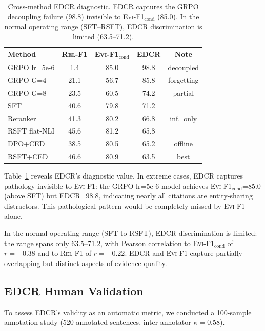 \documentclass[11pt,a4paper]{article}
\newcommand{\evi}{\textsc{Evi-F1}}
\newcommand{\edcr}{\textsc{EDCR}}
\newcommand{\relf}{\textsc{Rel-F1}}
\begin{document}
\begin{table}[t]
\centering
\small
\begin{tabular}{lcccc}
\toprule
\textbf{Method} & \textbf{\relf{}} & \textbf{\evi{}$_\text{cond}$} & \textbf{\edcr{}} & \textbf{Note} \\
\midrule
GRPO lr=5e-6 & 1.4 & 85.0 & 98.8 & decoupled \\
GRPO G=4 & 21.1 & 56.7 & 85.8 & forgetting \\
GRPO G=8 & 23.5 & 60.5 & 74.2 & partial \\
SFT & 40.6 & 79.8 & 71.2 & \\
Reranker & 41.3 & 80.2 & 66.8 & inf.\ only \\
RSFT flat-NLI & 45.6 & 81.2 & 65.8 & \\
DPO+CED & 38.5 & 80.5 & 65.2 & offline \\
RSFT+CED & 46.6 & 80.9 & 63.5 & best \\
\bottomrule
\end{tabular}
\caption{Cross-method \edcr{} diagnostic. \edcr{} captures the GRPO decoupling failure (98.8) invisible to \evi{}$_\text{cond}$ (85.0). In the normal operating range (SFT--RSFT), \edcr{} discrimination is limited (63.5--71.2).}
\label{tab:edcr_cross}
\end{table}

Table~\ref{tab:edcr_cross} reveals \edcr{}'s diagnostic value. In extreme cases, \edcr{} captures pathology invisible to \evi{}: the GRPO lr=5e-6 model achieves \evi{}$_\text{cond}$=85.0 (above SFT) but \edcr{}=98.8, indicating nearly all citations are entity-sharing distractors. This pathological pattern would be completely missed by \evi{} alone.

In the normal operating range (SFT to RSFT), \edcr{} discrimination is limited: the range spans only 63.5--71.2, with Pearson correlation to \evi{}$_\text{cond}$ of $r{=}-0.38$ and to \relf{} of $r{=}-0.22$. \edcr{} and \evi{} capture partially overlapping but distinct aspects of evidence quality.

\subsection{\edcr{} Human Validation}
\label{sec:edcr_human}

To assess \edcr{}'s validity as an automatic metric, we conducted a 100-sample annotation study (520 annotated sentences, inter-annotator $\kappa{=}0.58$).
\end{document}
